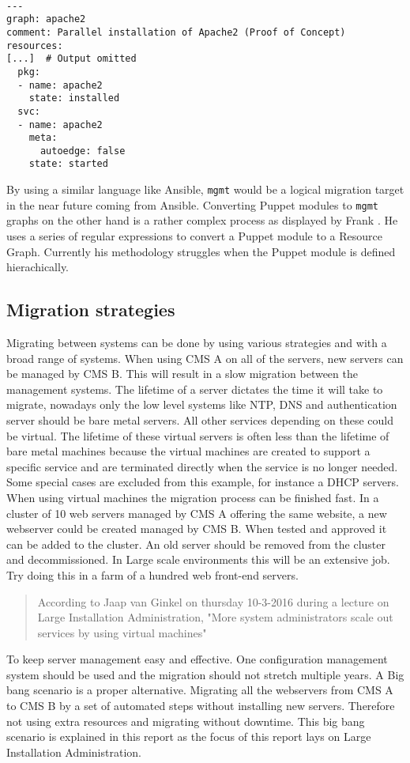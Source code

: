 \\
\begin{lstlisting}[caption={Snippet of Resource Graph Definition},label=lst:resgraph]
---
graph: apache2
comment: Parallel installation of Apache2 (Proof of Concept)
resources:
[...]  # Output omitted
  pkg:
  - name: apache2
    state: installed
  svc:
  - name: apache2
    meta:
      autoedge: false
    state: started
\end{lstlisting}
\noindent
By using a similar language like Ansible, \texttt{mgmt} would be a logical migration target in the near future coming from Ansible. Converting Puppet modules to \texttt{mgmt} graphs on the other hand is a rather complex process as displayed by Frank \cite{frank_2016}. He uses a series of regular expressions to convert a Puppet module to a Resource Graph. Currently his methodology struggles when the Puppet module is defined hierachically.

\subsection{Migration strategies}\label{subsec:migrationstrategies}
Migrating between systems can be done by using various strategies and with a broad range of systems. When using CMS A on all of the servers, new servers can be managed by CMS B. This will result in a slow migration between the management systems. The lifetime of a server dictates the time it will take to migrate, nowadays only the low level systems like NTP, DNS and authentication server should be bare metal servers. All other services depending on these could be virtual. The lifetime of these virtual servers is often less than the lifetime of bare metal machines because the virtual machines are created to support a specific service and are terminated directly when the service is no longer needed. Some special cases are excluded from this example, for instance a DHCP servers. When using virtual machines the migration process can be finished fast. In a cluster of 10 web servers managed by CMS A offering the same website, a new webserver could be created managed by CMS B. When tested and approved it can be added to the cluster. An old server should be removed from the cluster and decommissioned. In Large scale environments this will be an extensive job. Try doing this in a farm of a hundred web front-end servers.

\begin{quote}
According to Jaap van Ginkel on thursday 10-3-2016 during a lecture on Large Installation Administration, "More system administrators scale out services by using virtual machines"
\end{quote}

To keep server management easy and effective. One configuration management system should be used and the migration should not stretch multiple years. A Big bang scenario is a proper alternative. Migrating all the webservers from CMS A to CMS B by a set of automated steps without installing new servers. Therefore not using extra resources and migrating without downtime. This big bang scenario \cite{bigbang} is explained in this report as the focus of this report lays on Large Installation Administration.
